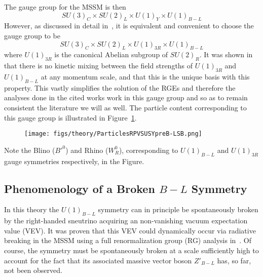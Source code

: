 The gauge group for the \BL MSSM is then
\begin{equation}
    SU(3)_{C} \times SU(2)_{L} \times U(1)_{Y} \times U(1)_{B-L}
\end{equation}
However, as discussed in detail in~\cite{Ovrut:2012wg}, it is equivalent and convenient to choose the gauge group to be
\begin{equation}
    SU(3)_{C} \times SU(2)_{L} \times U(1)_{3R} \times U(1)_{B-L}
\end{equation}
where $U(1)_{3R}$ is the canonical Abelian subgroup of $SU(2)_{R}$.
It was shown in~\cite{Ovrut:2012wg} that there is no kinetic mixing between the field strengths of $U(1)_{3R}$ and $U(1)_{B-L}$ at any momentum scale, and that this is the unique basis with this property.
This vastly simplifies the solution of the RGEs and therefore the analyses done in the cited works work in this gauge group and so as to remain consistent the literature we will as well.
The particle content corresponding to this gauge group is illustrated in Figure~\ref{fig:theory:particlesSUSYBLpreB-LSB}.
\begin{figure}[tb]
  \begin{center}
    \texttt{[image: figs/theory/ParticlesRPVSUSYpreB-LSB.png]}
  \end{center}
  \caption[Minimal SUSY \BL Model particle content, pre-\BL breaking]{\cite{KEK:2021}}
  \label{fig:theory:particlesSUSYBLpreB-LSB}
\end{figure}
Note the Blino ($B'^{0}$) and Rhino ($W_{R}^{0}$), corresponding to $U(1)_{B-L}$ and $U(1)_{3R}$ gauge symmetries respectively, in the Figure. 

\subsection{Phenomenology of a Broken $B-L$ Symmetry}
In this theory the $U(1)_{B-L}$ symmetry can in principle be spontaneously broken by the right-handed sneutrino acquiring an non-vanishing vacuum expectation value (VEV).
It was proven that this VEV could dynamically occur via radiative breaking in the \BL MSSM using a full renormalization group (RG) analysis in~\cite{Ambroso:2009jd}.
Of course, the symmetry must be spontaneously broken at a scale sufficiently high to account for the fact that its associated massive vector boson $Z'_{B-L}$ has, so far, not been observed.

